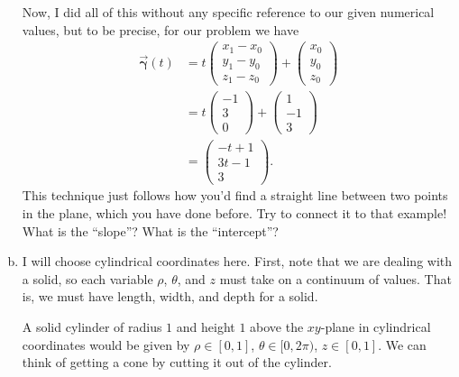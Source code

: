 \documentclass[12pt]{article} %
\newcommand{\curvegamma}{\boldsymbol{\vec{\gamma}}}
\begin{document}
\begin{solution}
\begin{enumerate}[(a)]
Now, I did all of this without any specific reference to our given numerical values, but to be precise, for our problem we have
\begin{align*}
\curvegamma(t) &= t \begin{pmatrix} x_1 - x_0\\ y_1 - y_0 \\ z_1 - z_0 \end{pmatrix} + \begin{pmatrix} x_0 \\ y_0 \\ z_0 \end{pmatrix}\\
&= t \begin{pmatrix} -1 \\ 3 \\ 0 \end{pmatrix} + \begin{pmatrix} 1 \\ -1 \\ 3 \end{pmatrix}\\
&= \begin{pmatrix} -t + 1 \\ 3t - 1 \\ 3 \end{pmatrix}.
\end{align*}
This technique just follows how you'd find a straight line between two points in the plane, which you have done before. Try to connect it to that example! What is the ``slope''? What is the ``intercept''?

\item I will choose cylindrical coordinates here. First, note that we are dealing with a solid, so each variable $\rho$, $\theta$, and $z$ must take on a continuum of values. That is, we must have length, width, and depth for a solid.

A solid cylinder of radius $1$ and height $1$ above the $xy$-plane in cylindrical coordinates would be given by $\rho \in [0,1]$, $\theta \in [0,2\pi)$, $z \in [0,1]$. We can think of getting a cone by cutting it out of the cylinder.


\end{enumerate}
\end{solution}
\end{document}
